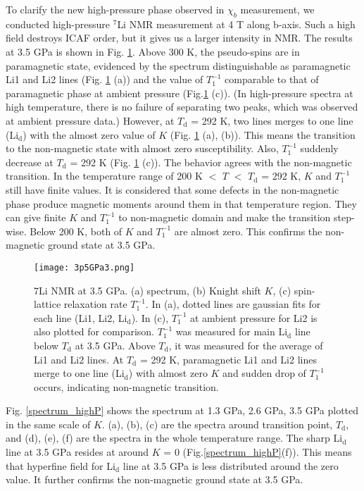 \documentclass[a4,10.5pt]{report}
\begin{document}
To clarify the new high-pressure phase observed in $\chi_b$ measurement, we conducted high-pressure ${}^7$Li NMR measurement at 4 T along b-axis. 
Such a high field destroys ICAF order, but it gives us a larger intensity in NMR. 
The results at 3.5 GPa is shown in Fig. \ref{3.5GPa}. 
Above 300 K, the pseudo-spins are in paramagnetic state, evidenced by the spectrum distinguishable as paramagnetic Li1 and Li2 lines (Fig. \ref{3.5GPa} (a)) 
and the value of $T^{-1}_1$ comparable to that of paramagnetic phase at ambient pressure (Fig.\ref{3.5GPa} (c)). 
(In high-pressure spectra at high temperature, there is no failure of separating two peaks, which was observed at ambient pressure data.)
However, at $T_{\mathrm{d}}$ = 292 K, two lines merges to one line (Li$_\mathrm{d}$) with the almost zero value of $K$ (Fig. \ref{3.5GPa} (a), (b)). 
This means the transition to the non-magnetic state with almost zero susceptibility. 
Also, $T^{-1}_1$ suddenly decrease at $T_{\mathrm{d}}$ = 292 K (Fig. \ref{3.5GPa} (c)). 
The behavior agrees with the non-magnetic transition. 
In the temperature range of 200 K $<$ $T$ $<$ $T_{\mathrm{d}}$ = 292 K, $K$ and $T^{-1}_1$ still have finite values. 
It is considered that some defects in the non-magnetic phase produce magnetic moments around them in that temperature region. 
They can give finite $K$ and $T^{-1}_1$ to non-magnetic domain and make the transition step-wise. 
Below 200 K, both of $K$ and $T^{-1}_1$ are almost zero. 
This confirms the non-magnetic ground state at 3.5 GPa.

\begin{figure}[H]
  \centering
  \texttt{[image: 3p5GPa3.png]}
  \caption{7Li NMR at 3.5 GPa. (a) spectrum, (b) Knight shift $K$, (c) spin-lattice relaxation rate $T^{-1}_1$.
  In (a), dotted lines are gaussian fits for each line (Li1, Li2, Li$_\mathrm{d}$).
  In (c), $T^{-1}_1$ at ambient pressure for Li2 is also plotted for comparison.
  $T^{-1}_1$ was measured for main Li$_\mathrm{d}$ line below $T_\mathrm{d}$ at 3.5 GPa.
  Above $T_\mathrm{d}$, it was measured for the average of Li1 and Li2 lines.
  At $T_{\mathrm{d}}$ = 292 K, paramagnetic Li1 and Li2 lines merge to one line (Li$_\mathrm{d}$)
  with almost zero $K$ and sudden drop of $T^{-1}_1$ occurs, indicating non-magnetic transition. }
  \label{3.5GPa}
\end{figure}

Fig. \ref{spectrum_highP} shows the spectrum at 1.3 GPa, 2.6 GPa, 3.5 GPa plotted in the same scale of $K$.
(a), (b), (c) are the spectra around transition point, $T_\mathrm{d}$, and (d), (e), (f) are the spectra in the whole temperature range.
The sharp Li$_\mathrm{d}$ line at 3.5 GPa resides at around $K$ = 0 (Fig.\ref{spectrum_highP}(f)). 
This means that hyperfine field for Li$_\mathrm{d}$ line at 3.5 GPa is less distributed around the zero value. 
It further confirms the non-magnetic ground state at 3.5 GPa.
\end{document}
